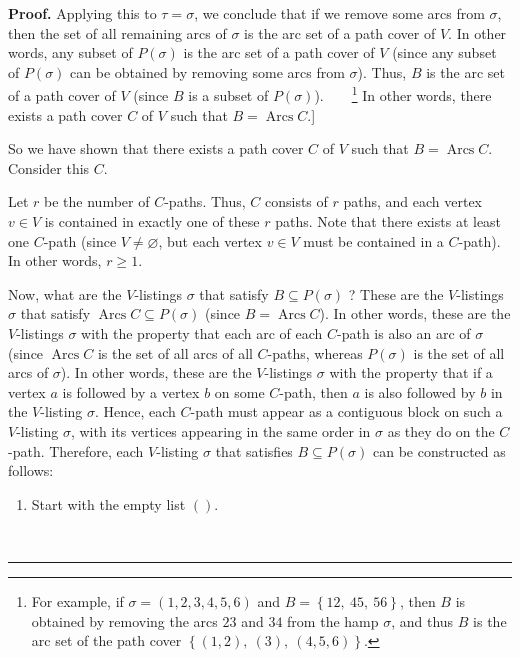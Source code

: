 \documentclass[numbers=enddot,12pt,final,onecolumn,notitlepage]{scrartcl}%
\numberwithin{exer}{subsection}
\theoremstyle{definition}
\newenvironment{proof}[1][Proof]{\noindent\textbf{#1.} }{\ \rule{0.5em}{0.5em}}
\begin{document}
\begin{proof}
Applying this to $\tau=\sigma$, we conclude that if we remove some arcs from
$\sigma$, then the set of all remaining arcs of $\sigma$ is the arc set of a
path cover of $V$. In other words, any subset of $P\left(  \sigma\right)  $ is
the arc set of a path cover of $V$ (since any subset of $P\left(
\sigma\right)  $ can be obtained by removing some arcs from $\sigma$). Thus,
$B$ is the arc set of a path cover of $V$ (since $B$ is a subset of $P\left(
\sigma\right)  $).\ \ \ \ \footnote{For example, if $\sigma=\left(
1,2,3,4,5,6\right)  $ and $B=\left\{  12,\ 45,\ 56\right\}  $, then $B$ is
obtained by removing the arcs $23$ and $34$ from the hamp $\sigma$, and thus
$B$ is the arc set of the path cover $\left\{  \left(  1,2\right)  ,\ \left(
3\right)  ,\ \left(  4,5,6\right)  \right\}  $.} In other words, there exists
a path cover $C$ of $V$ such that $B=\operatorname*{Arcs}C$.] \medskip

So we have shown that there exists a path cover $C$ of $V$ such that
$B=\operatorname*{Arcs}C$. Consider this $C$.

Let $r$ be the number of $C$-paths. Thus, $C$ consists of $r$ paths, and each
vertex $v\in V$ is contained in exactly one of these $r$ paths. Note that
there exists at least one $C$-path (since $V\neq\varnothing$, but each vertex
$v\in V$ must be contained in a $C$-path). In other words, $r\geq1$.

Now, what are the $V$-listings $\sigma$ that satisfy $B\subseteq P\left(
\sigma\right)  $ ? These are the $V$-listings $\sigma$ that satisfy
$\operatorname*{Arcs}C\subseteq P\left(  \sigma\right)  $ (since
$B=\operatorname*{Arcs}C$). In other words, these are the $V$-listings
$\sigma$ with the property that each arc of each $C$-path is also an arc of
$\sigma$ (since $\operatorname*{Arcs}C$ is the set of all arcs of all
$C$-paths, whereas $P\left(  \sigma\right)  $ is the set of all arcs of
$\sigma$). In other words, these are the $V$-listings $\sigma$ with the
property that if a vertex $a$ is followed by a vertex $b$ on some $C$-path,
then $a$ is also followed by $b$ in the $V$-listing $\sigma$. Hence, each
$C$-path must appear as a contiguous block on such a $V$-listing $\sigma$,
with its vertices appearing in the same order in $\sigma$ as they do on the
$C$-path. Therefore, each $V$-listing $\sigma$ that satisfies $B\subseteq
P\left(  \sigma\right)  $ can be constructed as follows:

\begin{enumerate}
\item Start with the empty list $\left(  {}\right)  $.


\end{enumerate}
\end{proof}
\end{document}
